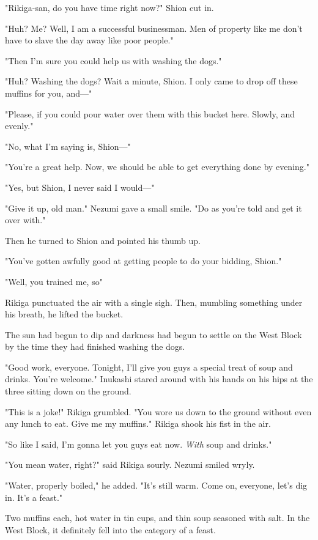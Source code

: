 "Rikiga-san, do you have time right now?" Shion cut in.

"Huh? Me? Well, I am a successful businessman. Men of property like me
don't have to slave the day away like poor people."

"Then I'm sure you could help us with washing the dogs."

"Huh? Washing the dogs? Wait a minute, Shion. I only came to drop off
these muffins for you, and---"

"Please, if you could pour water over them with this bucket here.
Slowly, and evenly."

"No, what I'm saying is, Shion---"

"You're a great help. Now, we should be able to get everything done by
evening."

"Yes, but Shion, I never said I would---"

"Give it up, old man." Nezumi gave a small smile. "Do as you're told and
get it over with."

Then he turned to Shion and pointed his thumb up.

"You've gotten awfully good at getting people to do your bidding,
Shion."

"Well, you trained me, so\el "

Rikiga punctuated the air with a single sigh. Then, mumbling something
under his breath, he lifted the bucket.

\mybreak

The sun had begun to dip and darkness had begun to settle on the West
Block by the time they had finished washing the dogs.

"Good work, everyone. Tonight, I'll give you guys a special treat of
soup and drinks. You're welcome." Inukashi stared around with his hands
on his hips at the three sitting down on the ground.

"This is a joke!" Rikiga grumbled. "You wore us down to the ground
without even any lunch to eat. Give me my muffins." Rikiga shook his
fist in the air.

"So like I said, I'm gonna let you guys eat now. \emph{With} soup and drinks."

"You mean water, right?" said Rikiga sourly. Nezumi smiled wryly.

"Water, properly boiled," he added. "It's still warm. Come on, everyone,
let's dig in. It's a feast."

Two muffins each, hot water in tin cups, and thin soup seasoned with
salt. In the West Block, it definitely fell into the category of a
feast.

